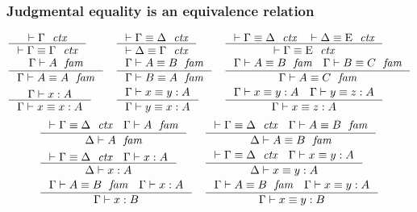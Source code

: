 \documentclass[handout]{beamer}
\begin{document}
\begin{frame}
\frametitle{Judgmental equality is an equivalence relation}
\begin{footnotesize}
\begin{align*}
& \inference
  { \jctx{\Gamma}
    }
  { \jctxeq{\Gamma}{\Gamma}
    } 
& & \inference
    { \jctxeq{\Gamma}{\Delta}
      }
    { \jctxeq{\Delta}{\Gamma}
      } 
& & \inference
    { \jctxeq{\Gamma}{\Delta}
      \jctxeq{\Delta}{\greek{E}}
      }
    { \jctxeq{\Gamma}{\greek{E}}
      }
    \\
& \inference
  { \jfam{\Gamma}{A}
    }
  { \jfameq{\Gamma}{A}{A}
    } 
& & \inference
    { \jfameq{\Gamma}{A}{B}
      }
    { \jfameq{\Gamma}{B}{A}
      }
& & \inference
    { \jfameq{\Gamma}{A}{B}
      \jfameq{\Gamma}{B}{C}
      }
    { \jfameq{\Gamma}{A}{C}
      }
    \\
& \inference
  { \jterm{\Gamma}{A}{x}
    }
  { \jtermeq{\Gamma}{A}{x}{x}
    }
& & \inference
    { \jtermeq{\Gamma}{A}{x}{y}
      }
    { \jtermeq{\Gamma}{A}{y}{x}
      }
& & \inference
    { \jtermeq{\Gamma}{A}{x}{y}
      \jtermeq{\Gamma}{A}{y}{z}
      }
    { \jtermeq{\Gamma}{A}{x}{z}
      }
\end{align*}
\begin{align*}
& \inference
  { \jctxeq{\Gamma}{\Delta}
    \jfam{\Gamma}{A}
    }
  { \jfam{\Delta}{A}
    }
& & \inference
    { \jctxeq{\Gamma}{\Delta}
      \jfameq{\Gamma}{A}{B}
      }
    { \jfameq{\Delta}{A}{B}
      }
    \\
& \inference
  { \jctxeq{\Gamma}{\Delta}
    \jterm{\Gamma}{A}{x}
    }
  { \jterm{\Delta}{A}{x}
    }
& & \inference
    { \jctxeq{\Gamma}{\Delta}
      \jtermeq{\Gamma}{A}{x}{y}
      }
    { \jtermeq{\Delta}{A}{x}{y}
      }
    \\
& \inference
  { \jfameq{\Gamma}{A}{B}
    \jterm{\Gamma}{A}{x}
    }
  { \jterm{\Gamma}{B}{x}
    }
& & \inference
    { \jfameq{\Gamma}{A}{B}
      \jtermeq{\Gamma}{A}{x}{y}
      }
    { \jtermeq{\Gamma}{B}{x}{y}
      }
\end{align*}
\end{footnotesize}
\end{frame}
\end{document}
